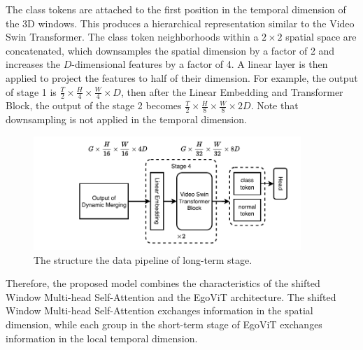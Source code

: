 The class tokens are attached to the first position in the temporal dimension of the 3D windows.  This produces a hierarchical representation similar to the Video Swin Transformer. The class token neighborhoods within a $2 \times 2$ spatial space are concatenated, which downsamples the spatial dimension by a factor of 2 and increases the $D$-dimensional features by a factor of 4. A linear layer is then applied to project the features to half of their dimension. For example, the output of stage 1 is $\frac{T}{2} \times \frac{H}{4} \times \frac{W}{4} \times D$, then after the Linear Embedding and Transformer Block, the output of the stage 2 becomes $\frac{T}{2} \times \frac{H}{8} \times \frac{W}{8} \times 2D$. Note that downsampling is not applied in the temporal dimension.

\begin{figure}[t]
    \centering
    \includegraphics[width=0.9\textwidth]{graphics/vst_lt.pdf}
    \caption{The structure the data pipeline of long-term stage.}
    \label{fig:video_swin_transformer_lt}
\end{figure}

Therefore, the proposed model combines the characteristics of the shifted Window Multi-head Self-Attention and the EgoViT architecture. The shifted Window Multi-head Self-Attention exchanges information in the spatial dimension, while each group in the short-term stage of EgoViT exchanges information in the local temporal dimension. 

